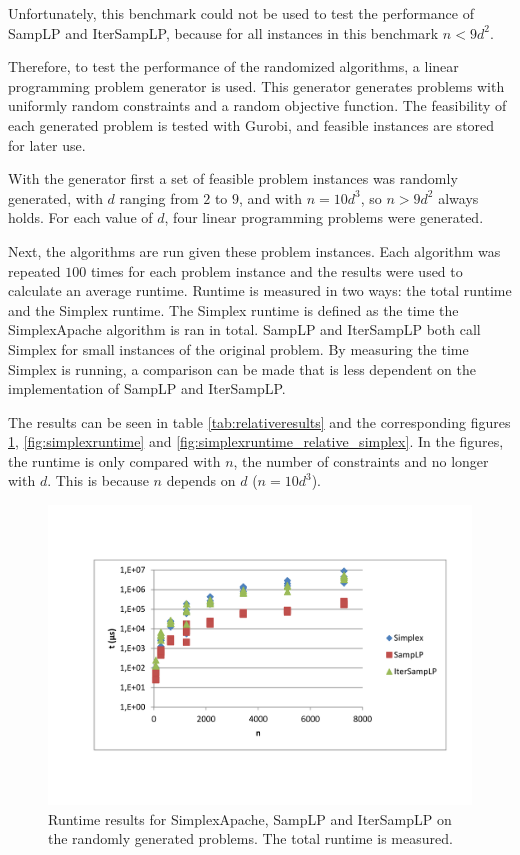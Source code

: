 \documentclass[nocopyrightspace]{acm_proc_article-sp}
\begin{document}
Unfortunately, this benchmark could not be used to test the performance of SampLP and IterSampLP, because for all instances in this benchmark $n < 9d^2$. 

Therefore, to test the performance of the randomized algorithms, a linear programming problem generator is used. This generator generates problems with uniformly random constraints and a random objective function. The feasibility of each generated problem is tested with Gurobi, and feasible instances are stored for later use.

With the generator first a set of feasible problem instances was randomly generated, with $d$ ranging from $2$ to $9$, and with $n = 10d^3$, so $n > 9d^2$ always holds. For each value of $d$, four linear programming problems were generated. 

Next, the algorithms are run given these problem instances. Each algorithm was repeated $100$ times for each problem instance and the results were used to calculate an average runtime. Runtime is measured in two ways: the total runtime and the Simplex runtime. The Simplex runtime is defined as the time the SimplexApache algorithm is ran in total. SampLP and IterSampLP both call Simplex for small instances of the original problem. By measuring the time Simplex is running, a comparison can be made that is less dependent on the implementation of SampLP and IterSampLP.

The results can be seen in table \ref{tab:relativeresults} and the corresponding figures \ref{fig:totalruntime}, \ref{fig:simplexruntime} and \ref{fig:simplexruntime_relative_simplex}. In the figures, the runtime is only compared with $n$, the number of constraints and no longer with $d$. This is because $n$ depends on $d$ ($n=10d^3$). 

\begin{figure}[h!]
\includegraphics[width=\columnwidth]{../Results/totalruntime.pdf}
\caption{Runtime results for SimplexApache, SampLP and IterSampLP on the randomly generated problems. The total runtime is measured.}
\label{fig:totalruntime}
\end{figure}
\end{document}
